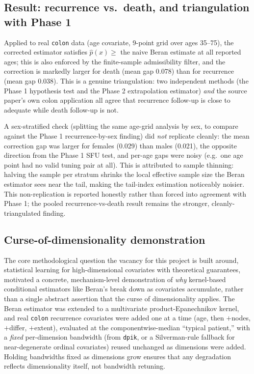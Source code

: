 \documentclass[11pt]{article}
\begin{document}
\subsection{Result: recurrence vs.\ death, and triangulation with Phase 1}

Applied to real \texttt{colon} data (age covariate, 9-point grid over ages 35--75),
the corrected estimator satisfies $\hat p(x) \geq$ the naive Beran estimate at all
reported ages; this is also enforced by the finite-sample admissibility filter, and the correction is markedly larger for death (mean gap 0.078)
than for recurrence (mean gap 0.038). This is a genuine triangulation: two
independent methods (the Phase 1 hypothesis test and the Phase 2 extrapolation
estimator) \emph{and} the source paper's own colon application all agree
that recurrence follow-up is close to adequate while death follow-up is not.

A sex-stratified check (splitting the same age-grid analysis by sex, to compare
against the Phase 1 recurrence-by-sex finding) did \emph{not} replicate cleanly:
the mean correction gap was larger for females (0.029) than males (0.021), the
opposite direction from the Phase 1 SFU test, and per-age gaps were noisy (e.g.\
one age point had no valid tuning pair at all). This is attributed to sample
thinning: halving the sample per stratum shrinks the local effective sample size
the Beran estimator sees near the tail, making the tail-index estimation
noticeably noisier. This non-replication is reported honestly rather than forced
into agreement with Phase 1; the pooled recurrence-vs-death result remains the
stronger, cleanly-triangulated finding.

\subsection{Curse-of-dimensionality demonstration}

The core methodological question the vacancy for this project is built around,
statistical learning for high-dimensional covariates with theoretical
guarantees, motivated a concrete, mechanism-level demonstration of \emph{why}
kernel-based conditional estimators like Beran's break down as covariates
accumulate, rather than a single abstract assertion that the curse of
dimensionality applies. The Beran estimator was extended to a multivariate
product-Epanechnikov kernel, and real \texttt{colon} recurrence covariates were
added one at a time (age, then $+$nodes, $+$differ, $+$extent), evaluated at the
componentwise-median ``typical patient,'' with a \emph{fixed} per-dimension
bandwidth (from \texttt{dpik}, or a Silverman-rule fallback for near-degenerate
ordinal covariates) reused unchanged as dimensions were added. Holding
bandwidths fixed as dimensions grow ensures that any degradation reflects
dimensionality itself, not bandwidth retuning.
\end{document}
